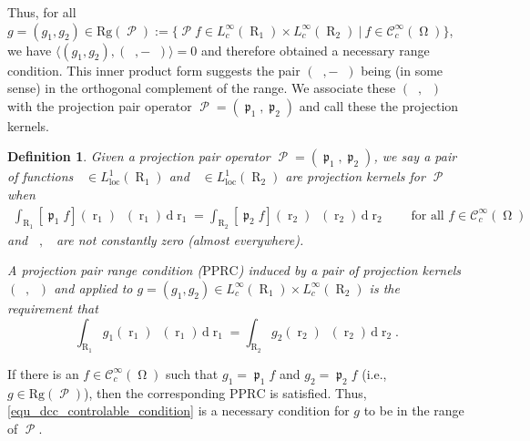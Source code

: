 \documentclass[12pt]{article}
\newtheorem{definition}[theorem]{Definition}
\DeclareMathOperator{\Proj}{\mathcal{P}}
\DeclareMathOperator{\Projind}{\mathfrak{p}}
\newcommand{\dd}[1]{\,\mathrm{d}{#1}}
\newcommand{\rg}[1]{\mathrm{Rg}({#1})}
\DeclareMathOperator{\rayvariable}{r}
\DeclareMathOperator{\raygroundset}{R}
\DeclareMathOperator{\Vone}{V_1}
\DeclareMathOperator{\Vtwo}{V_2}
\newcommand{\conditionname}{$\mathrm{PPRC}$}
\DeclareMathOperator{\imgdom}{{\Omega}}
\begin{document}
Thus,  for all $g=(g_1,g_2) \in \rg{\Proj}:=\{\Proj f \in L^\infty_c(\raygroundset_1)\times L^\infty_c(\raygroundset_2) \ \big | \ f \in \mathcal{C}^\infty_c(\imgdom)\}$, we have $\langle(g_1,g_2),(\Vone,-\Vtwo)\rangle=0$ and therefore obtained a necessary range condition. This inner product form suggests the pair $(\Vone,-\Vtwo)$ being (in some sense) in the orthogonal complement of the range.
We associate these $(\Vone,\Vtwo)$ with the projection pair operator $\Proj=(\Projind_1,\Projind_2)$ and call these the projection kernels.






\begin{definition}
\label{def_LPPRC_kernel}
Given a projection pair operator  $\Proj=(\Projind_1,\Projind_2)$, we say a pair of functions   $\Vone\in L^1_\text{loc}(\raygroundset_1)$  and $\Vtwo\in L^1_\text{loc}(\raygroundset_2)$ are projection kernels  for $\Proj$ when
\begin{multline}\label{equ_general_zero_order_consistency}
\int_{\raygroundset_1} [\Projind_1 f](\rayvariable_1) \Vone(\rayvariable_1) \dd {\rayvariable_1} = \int_{\raygroundset_2} [\Projind_2 f](\rayvariable_2) \Vtwo(\rayvariable_2) \dd {\rayvariable_2}  \qquad \text{for all }f\in \mathcal{C}^\infty_c(\imgdom)
\end{multline}
and $\Vone,\Vtwo$ are not constantly zero (almost everywhere). 

A projection pair range condition (\conditionname) induced by a pair of projection kernels $(\Vone,\Vtwo)$ and applied to $g=(g_1,g_2)\in L^\infty_c(\raygroundset_1)\times L^\infty_c(\raygroundset_2)$ is the requirement that
\begin{equation}\label{equ_dcc_controlable_condition}
\int_{\raygroundset_1} g_1(\rayvariable_1) \Vone(\rayvariable_1) \dd {\rayvariable_1} = \int_{\raygroundset_2} g_2(\rayvariable_2) \Vtwo(\rayvariable_2) \dd {\rayvariable_2}. 
\end{equation}
\end{definition}
If there is an $f \in \mathcal{C}^\infty_c(\imgdom)$ such that $g_1=\Projind_1f$ and $g_2=\Projind_2f$ (i.e., $g\in \rg{\Proj}$), then the corresponding \conditionname{}  is satisfied. Thus, \eqref{equ_dcc_controlable_condition} is a necessary condition for $g$ to be in the range of $\Proj$. %
\end{document}
